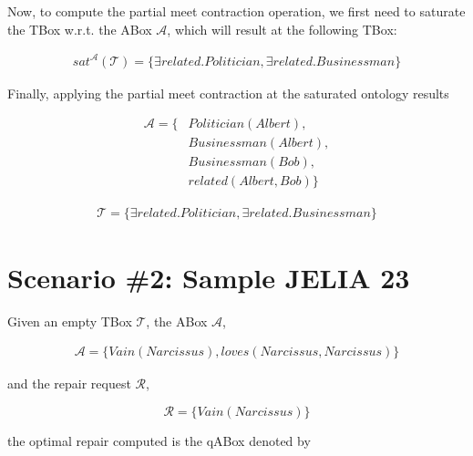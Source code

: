 Now, to compute the partial meet contraction operation, we first need to saturate the TBox w.r.t. the ABox $\mathcal{A}$, which will result at the following TBox:

\begin{equation*}
    \begin{aligned}
        sat^{\mathcal{A}}(\mathcal{T}) = \{ \exists related.Politician, \exists related.Businessman \}
    \end{aligned}
\end{equation*}

Finally, applying the partial meet contraction at the saturated ontology results

\begin{equation*}
    \begin{aligned}
        \mathcal{A} = \{ & Politician(Albert),  \\
                         & Businessman(Albert), \\
                         & Businessman(Bob),    \\
                         & related(Albert, Bob) \}
    \end{aligned}
\end{equation*}

\begin{equation*}
    \begin{aligned}
        \mathcal{T} = \{ \exists related.Politician, \exists related.Businessman \}
    \end{aligned}
\end{equation*}

\section{Scenario \#2: Sample JELIA 23}
\label{sec:scenario-2}
Given an empty TBox $\mathcal{T}$, the ABox $\mathcal{A}$,

\begin{equation*}
    \begin{aligned}
        \mathcal{A} = \{ Vain(Narcissus), loves(Narcissus, Narcissus) \}
    \end{aligned}
\end{equation*}

and the repair request $\mathcal{R}$,

$$\mathcal{R} = \{ Vain(Narcissus) \}$$

the optimal repair computed is the qABox denoted by

